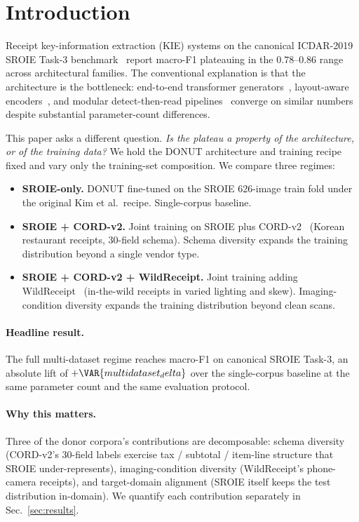 \section{Introduction}
\label{sec:intro}

Receipt key-information extraction (KIE) systems on the canonical
ICDAR-2019 SROIE Task-3 benchmark~\cite{huang2019icdar} report
macro-F1 plateauing in the $0.78$--$0.86$ range across architectural
families.  The conventional explanation is that the architecture is
the bottleneck: end-to-end transformer
generators~\cite{kim2022donut}, layout-aware
encoders~\cite{huang2022layoutlmv3}, and modular detect-then-read
pipelines~\cite{yu2020pick} converge on similar numbers despite
substantial parameter-count differences.

This paper asks a different question.  \emph{Is the plateau a
property of the architecture, or of the training data?}  We hold the
DONUT architecture and training recipe fixed and vary only the
training-set composition.  We compare three regimes:

\begin{itemize}
\item \textbf{SROIE-only.}  DONUT fine-tuned on the SROIE 626-image
  train fold under the original Kim et al.\ recipe.  Single-corpus
  baseline.
\item \textbf{SROIE + CORD-v2.}  Joint training on SROIE plus
  CORD-v2~\cite{park2019cord} (Korean restaurant receipts, 30-field
  schema).  Schema diversity expands the training distribution
  beyond a single vendor type.
\item \textbf{SROIE + CORD-v2 + WildReceipt.}  Joint training adding
  WildReceipt~\cite{sun2021wildreceipt} (in-the-wild receipts in
  varied lighting and skew).  Imaging-condition diversity expands
  the training distribution beyond clean scans.
\end{itemize}

\paragraph{Headline result.}  The full multi-dataset regime reaches
 macro-F1 on canonical SROIE Task-3, an absolute lift
of $+\VAR{multidataset_delta}$ over the single-corpus baseline at
the same parameter count and the same evaluation protocol.

\paragraph{Why this matters.}  Three of the donor corpora's
contributions are decomposable: schema diversity (CORD-v2's 30-field
labels exercise tax / subtotal / item-line structure that SROIE
under-represents), imaging-condition diversity (WildReceipt's
phone-camera receipts), and target-domain alignment (SROIE itself
keeps the test distribution in-domain).  We quantify each
contribution separately in Sec.~\ref{sec:results}.

